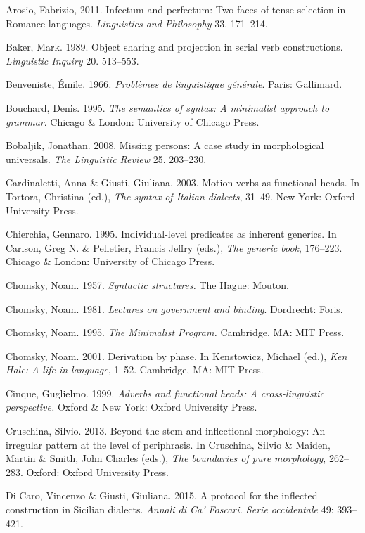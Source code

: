 \documentclass[output=paper]{langsci/langscibook}
\begin{document}
Arosio, Fabrizio, 2011. Infectum and perfectum: Two faces of tense selection in Romance languages. \textit{Linguistics and Philosophy} 33. 171–214.

Baker, Mark. 1989. Object sharing and projection in serial verb constructions. \textit{Linguistic Inquiry} 20. 513–553.

Benveniste, Émile. 1966\textit{. Problèmes de linguistique générale}. Paris: Gallimard.

Bouchard, Denis. 1995. \textit{The semantics of syntax: A minimalist approach to grammar}. Chicago \& London: University of Chicago Press.

Bobaljik, Jonathan. 2008. Missing persons: A case study in morphological universals. \textit{The Linguistic Review} 25. 203–230.

Cardinaletti, Anna \& Giusti, Giuliana. 2003. Motion verbs as functional heads. In Tortora, Christina (ed.), \textit{The syntax of Italian dialects}, 31–49. New York: Oxford University Press.

Chierchia, Gennaro. 1995. Individual-level predicates as inherent generics. In Carlson, Greg N. \& Pelletier, Francis Jeffry (eds.), \textit{The generic book}, 176–223. Chicago \& London: University of Chicago Press. 

Chomsky, Noam. 1957. \textit{Syntactic structures.} The Hague: Mouton.

Chomsky, Noam. 1981. \textit{Lectures on government and binding}. Dordrecht: Foris.

Chomsky, Noam. 1995. \textit{The Minimalist Program.} Cambridge, MA: MIT Press.

\begin{styleSfondomedioiColorexi}
Chomsky, Noam. 2001. Derivation by phase. In Kenstowicz, Michael (ed.), \textit{Ken Hale: A life in language}, 1–52. Cambridge, MA: MIT Press.
\end{styleSfondomedioiColorexi}

Cinque, Guglielmo. 1999. \textit{Adverbs and functional heads: A cross-linguistic perspective.} Oxford \& New York: Oxford University Press.

Cruschina, Silvio. 2013. Beyond the stem and inflectional morphology: An irregular pattern at the level of periphrasis. In Cruschina, Silvio \& Maiden, Martin \& Smith, John Charles (eds.), \textit{The boundaries of pure morphology}, 262–283. Oxford: Oxford University Press.

Di Caro, Vincenzo \& Giusti, Giuliana. 2015. A protocol for the inflected construction in Sicilian dialects. \textit{Annali di Ca’ Foscari. Serie occidentale} 49: 393–421.
\end{document}
